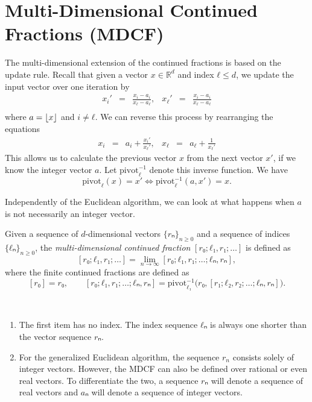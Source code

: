 \section{Multi-Dimensional Continued Fractions (MDCF)}

The multi-dimensional extension of the continued fractions is based on the
update rule. Recall that given a vector $x ∈ ℝ^d$ and index $ℓ ≤ d$, we update
the input vector over one iteration by
\[
  \begin{array}{lcrlcr}
    \displaystyle x_i' & = & \displaystyle \frac{x_i - a_i}{x_ℓ - a_ℓ}, &
    \displaystyle x_ℓ' & = & \displaystyle \frac{x_i - a_i}{x_ℓ - a_ℓ} \\[1em]
  \end{array}
\]
where $a = \lfloor x\rfloor$ and $i ≠ ℓ$.
We can reverse this process by rearranging the equations
\[
  \begin{array}{lcrlcr}
    \displaystyle x_i & = & a_i + \displaystyle \frac{x_i'}{x_ℓ'}, &
    \displaystyle x_ℓ & = & a_ℓ + \displaystyle \frac{1}{x_ℓ'}
  \end{array}
\]
This allows us to calculate the previous vector $x$ from the next vector $x'$,
if we know the integer vector $a$.
Let $\mathrm{pivot}_ℓ^{-1}$ denote this inverse function.
We have
\[
  \mathrm{pivot}_ℓ(x) = x' \iff \mathrm{pivot}_ℓ^{-1}(a, x') = x.
\]

Independently of the Euclidean algorithm,
we can look at what happens when $a$ is not necessarily an integer vector.

\begin{definition}
  Given a sequence of $d$-dimensional vectors $\{rₙ\}_{n ≥ 0}$ and a sequence of
  indices $\{ℓₙ\}_{n ≥ 0}$, the \emph{multi-dimensional continued fraction} $[r₀; ℓ₁, r₁; …]$
  is defined as
  \[
    [r₀; ℓ₁, r₁; …] = \lim_{n → ∞} [r₀; ℓ₁, r₁; …; ℓₙ, rₙ],
  \]
  where the finite continued fractions are defined as
  \[
    [r₀] = r₀, \qquad [r₀; ℓ₁, r₁; …; ℓₙ, rₙ] = \mathrm{pivot}_{ℓ₁}^{-1}\big(r₀, [r₁; ℓ₂, r₂; …; ℓₙ, rₙ]\big).
  \]
\end{definition}

\begin{remark}~
  \begin{enumerate}
    \item
      The first item has no index.
      The index sequence $ℓₙ$ is always one shorter than the vector sequence $rₙ$.
    \item
      For the generalized Euclidean algorithm, the sequence $r_n$ consists solely of integer vectors.
      However, the MDCF can also be defined over rational or even real vectors.
      To differentiate the two, a sequence $rₙ$ will denote a sequence of real
      vectors and $aₙ$ will denote a sequence of integer vectors.
  \end{enumerate}
\end{remark}

